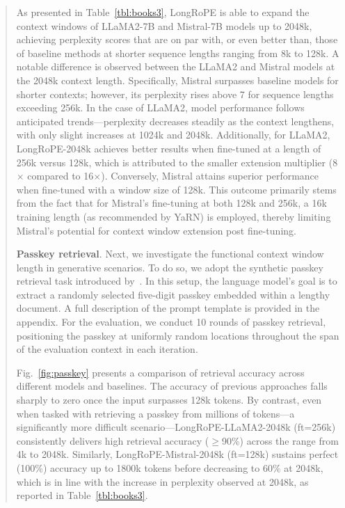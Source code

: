 \begin{abstract}
As presented in Table~\ref{tbl:books3}, LongRoPE is able to expand the context windows of LLaMA2-7B and Mistral-7B models up to 2048k, achieving perplexity scores that are on par with, or even better than, those of baseline methods at shorter sequence lengths ranging from 8k to 128k. A notable difference is observed between the LLaMA2 and Mistral models at the 2048k context length. Specifically, Mistral surpasses baseline models for shorter contexts; however, its perplexity rises above 7 for sequence lengths exceeding 256k. In the case of LLaMA2, model performance follows anticipated trends—perplexity decreases steadily as the context lengthens, with only slight increases at 1024k and 2048k. Additionally, for LLaMA2, LongRoPE-2048k achieves better results when fine-tuned at a length of 256k versus 128k, which is attributed to the smaller extension multiplier (8$\times$ compared to 16$\times$). Conversely, Mistral attains superior performance when fine-tuned with a window size of 128k. This outcome primarily stems from the fact that for Mistral's fine-tuning at both 128k and 256k, a 16k training length (as recommended by YaRN) is employed, thereby limiting Mistral’s potential for context window extension post fine-tuning.

\textbf{Passkey retrieval}. Next, we investigate the functional context window length in generative scenarios. To do so, we adopt the synthetic passkey retrieval task introduced by~\cite{passkey}. In this setup, the language model's goal is to extract a randomly selected five-digit passkey embedded within a lengthy document. A full description of the prompt template is provided in the appendix. For the evaluation, we conduct 10 rounds of passkey retrieval, positioning the passkey at uniformly random locations throughout the span of the evaluation context in each iteration.

Fig.~\ref{fig:passkey} presents a comparison of retrieval accuracy across different models and baselines. The accuracy of previous approaches falls sharply to zero once the input surpasses 128k tokens. By contrast, even when tasked with retrieving a passkey from millions of tokens—a significantly more difficult scenario—LongRoPE-LLaMA2-2048k (ft=256k) consistently delivers high retrieval accuracy ($\ge$90\%) across the range from 4k to 2048k. Similarly, LongRoPE-Mistral-2048k (ft=128k) sustains perfect (100\%) accuracy up to 1800k tokens before decreasing to 60\% at 2048k, which is in line with the increase in perplexity observed at 2048k, as reported in Table~\ref{tbl:books3}.


\end{abstract}
